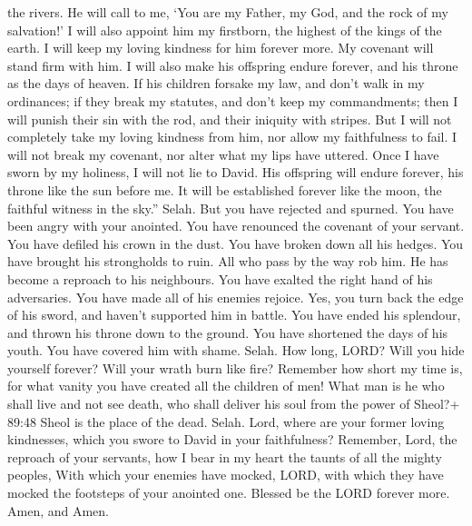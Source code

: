 the rivers.  He will call to me, `You are my Father, my
God, and the rock of my salvation!'  I will also appoint
him my firstborn, the highest of the kings of the earth.  I
will keep my loving kindness for him forever more. My covenant will
stand firm with him.  I will also make his offspring endure
forever, and his throne as the days of heaven.  If his
children forsake my law, and don't walk in my ordinances; 
if they break my statutes, and don't keep my commandments; 
then I will punish their sin with the rod, and their iniquity with
stripes.  But I will not completely take my loving kindness
from him, nor allow my faithfulness to fail.  I will not
break my covenant, nor alter what my lips have uttered. 
Once I have sworn by my holiness, I will not lie to David. 
His offspring will endure forever, his throne like the sun before me.
 It will be established forever like the moon, the faithful
witness in the sky.'' Selah.  But you have rejected and
spurned. You have been angry with your anointed.  You have
renounced the covenant of your servant. You have defiled his crown in
the dust.  You have broken down all his hedges. You have
brought his strongholds to ruin.  All who pass by the way
rob him. He has become a reproach to his neighbours.  You
have exalted the right hand of his adversaries. You have made all of his
enemies rejoice.  Yes, you turn back the edge of his sword,
and haven't supported him in battle.  You have ended his
splendour, and thrown his throne down to the ground.  You
have shortened the days of his youth. You have covered him with shame.
Selah.  How long, LORD? Will you hide yourself forever?
Will your wrath burn like fire?  Remember how short my time
is, for what vanity you have created all the children of men!
 What man is he who shall live and not see death, who shall
deliver his soul from the power of Sheol?+ 89:48 Sheol is the place of
the dead. Selah.  Lord, where are your former loving
kindnesses, which you swore to David in your faithfulness? 
Remember, Lord, the reproach of your servants, how I bear in my heart
the taunts of all the mighty peoples,  With which your
enemies have mocked, LORD, with which they have mocked the footsteps of
your anointed one.  Blessed be the LORD forever more. Amen,
and Amen.


